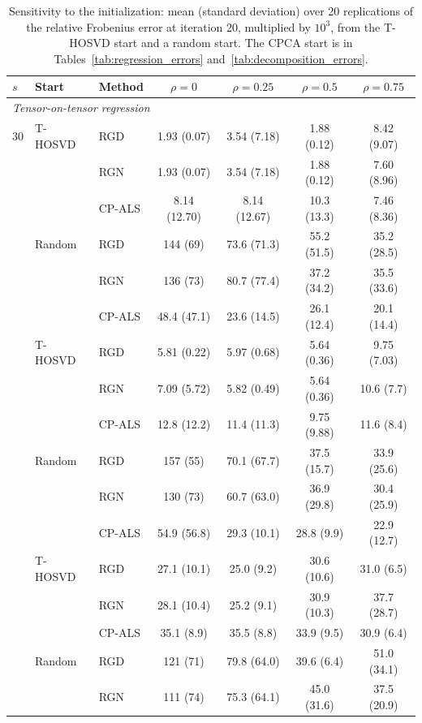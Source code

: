 \begin{table}[!htbp]
\centering
\caption{Sensitivity to the initialization: mean (standard deviation) over 20 replications of the relative Frobenius error at iteration 20, multiplied by $10^3$, from the T-HOSVD start and a random start. The CPCA start is in Tables~\ref{tab:regression_errors} and~\ref{tab:decomposition_errors}.}
\label{tab:initialization}
{\small
\begin{tabular}{lllcccc}
\toprule
$s$ & Start & Method & $\rho=0$ & $\rho=0.25$ & $\rho=0.5$ & $\rho=0.75$ \\
\midrule
\multicolumn{7}{l}{\emph{Tensor-on-tensor regression}} \\
30 & T-HOSVD & RGD & 1.93 (0.07) & 3.54 (7.18) & 1.88 (0.12) & 8.42 (9.07) \\
 &  & RGN & 1.93 (0.07) & 3.54 (7.18) & 1.88 (0.12) & 7.60 (8.96) \\
 &  & CP-ALS & 8.14 (12.70) & 8.14 (12.67) & 10.3 (13.3) & 7.46 (8.36) \\
 & Random & RGD & 144 (69) & 73.6 (71.3) & 55.2 (51.5) & 35.2 (28.5) \\
 &  & RGN & 136 (73) & 80.7 (77.4) & 37.2 (34.2) & 35.5 (33.6) \\
 &  & CP-ALS & 48.4 (47.1) & 23.6 (14.5) & 26.1 (12.4) & 20.1 (14.4) \\
\addlinespace
10 & T-HOSVD & RGD & 5.81 (0.22) & 5.97 (0.68) & 5.64 (0.36) & 9.75 (7.03) \\
 &  & RGN & 7.09 (5.72) & 5.82 (0.49) & 5.64 (0.36) & 10.6 (7.7) \\
 &  & CP-ALS & 12.8 (12.2) & 11.4 (11.3) & 9.75 (9.88) & 11.6 (8.4) \\
 & Random & RGD & 157 (55) & 70.1 (67.7) & 37.5 (15.7) & 33.9 (25.6) \\
 &  & RGN & 130 (73) & 60.7 (63.0) & 36.9 (29.8) & 30.4 (25.9) \\
 &  & CP-ALS & 54.9 (56.8) & 29.3 (10.1) & 28.8 (9.9) & 22.9 (12.7) \\
\addlinespace
3 & T-HOSVD & RGD & 27.1 (10.1) & 25.0 (9.2) & 30.6 (10.6) & 31.0 (6.5) \\
 &  & RGN & 28.1 (10.4) & 25.2 (9.1) & 30.9 (10.3) & 37.7 (28.7) \\
 &  & CP-ALS & 35.1 (8.9) & 35.5 (8.8) & 33.9 (9.5) & 30.9 (6.4) \\
 & Random & RGD & 121 (71) & 79.8 (64.0) & 39.6 (6.4) & 51.0 (34.1) \\
 &  & RGN & 111 (74) & 75.3 (64.1) & 45.0 (31.6) & 37.5 (20.9) \\

\end{tabular}}
\end{table}
